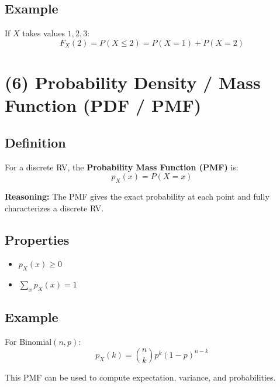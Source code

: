 \documentclass[11pt]{article}
\begin{document}
\subsection*{Example}
If $X$ takes values $1,2,3$:
\[
F_X(2) = P(X \le 2) = P(X=1)+P(X=2)
\]

\section*{(6) Probability Density / Mass Function (PDF / PMF)}

\subsection*{Definition}
For a discrete RV, the \textbf{Probability Mass Function (PMF)} is:
\[
p_X(x) = P(X = x)
\]

\textbf{Reasoning:}  
The PMF gives the exact probability at each point and fully characterizes a discrete RV.

\subsection*{Properties}
\begin{itemize}
    \item $p_X(x) \ge 0$
    \item $\sum_x p_X(x) = 1$
\end{itemize}

\subsection*{Example}
For Binomial$(n,p)$:
\[
p_X(k) = \binom{n}{k} p^k (1-p)^{n-k}
\]

This PMF can be used to compute expectation, variance, and probabilities.
\end{document}
